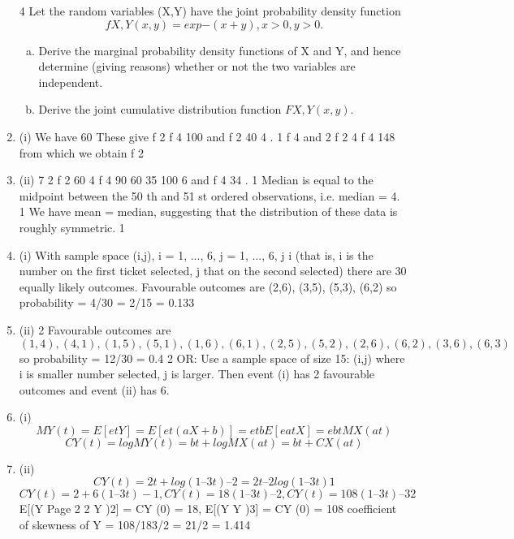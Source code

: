 \documentclass[a4paper,12pt]{article}
\begin{document}
\begin{enumerate}
4
Let the random variables (X,Y) have the joint probability density function
\[f X , Y ( x , y ) = exp{ − ( x + y )}, x > 0, y > 0.\]
\begin{enumerate}[(a)]
\item Derive the marginal probability density functions of X and Y, and hence determine (giving reasons) whether or not the two variables are independent.
\item Derive the joint cumulative distribution function $F X , Y ( x , y )$.
\end{enumerate}
\item (i)
We have 60
These give f 2
f 4 100 and
f 2
40
4 .
1
f 4 and 2 f 2 4 f 4 148
from which we obtain f 2
\item (ii)
7 2 f 2 60 4 f 4 90 60 35
100
6 and f 4
34 .
1
Median is equal to the midpoint between the 50 th and 51 st ordered observations, i.e. median = 4. 1
We have mean = median, suggesting that the distribution of these data is roughly symmetric. 1
\item (i)
With sample space {(i,j), i = 1, ..., 6, j = 1, ..., 6, j
i}
(that is, i is the number on the first ticket selected, j that on the second
selected) there are 30 equally likely outcomes.
Favourable outcomes are (2,6), (3,5), (5,3), (6,2)
so probability = 4/30 = 2/15 = 0.133
\item (ii)
2
Favourable outcomes are
\[(1,4), (4,1), (1,5), (5,1), (1,6), (6,1), (2,5), (5,2), (2,6), (6,2), (3,6), (6,3)\]
so probability = 12/30 = 0.4
2
OR: Use a sample space of size 15: {(i,j)} where i is smaller number selected,
j is larger.
Then event (i) has 2 favourable outcomes and event (ii) has 6.
\item (i)
\[MY (t) = E[etY ] = E[et(aX+b)] = etbE[eatX ] = ebtMX (at)\]
\[CY (t) = log MY (t) = bt + log MX (at) = bt + CX (at)\]
\item (ii)
\[CY (t) = 2t + log(1 – 3t) –2 = 2t – 2log(1 – 3t) 1\]
\[CY (t) = 2 + 6(1 – 3t)-1 , CY (t) = 18(1 – 3t) –2 , CY (t) = 108(1 – 3t) –3 2\]
E[(Y
Page 2
2
\mu  Y )2] = CY (0) = 18, E[(Y
\mu  Y )3] = CY (0) = 108
coefficient of skewness of Y = 108/183/2 = 21/2 = 1.414

\end{enumerate}
\end{document}
